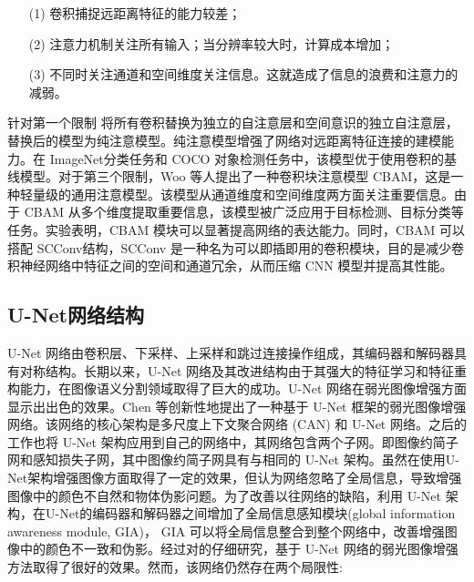 \documentclass[a4paper]{ctexart}
\begin{document}
	\begin{itemize}
		\item[(1)] 
		卷积捕捉远距离特征的能力较差；
		
		\item[(2)]
		注意力机制关注所有输入；当分辨率较大时，计算成本增加；
		
		\item[(3)]
		不同时关注通道和空间维度关注信息。这就造成了信息的浪费和注意力的减弱。
	\end{itemize}	
	
	针对第一个限制 \cite{ramachandran2019stand} 将所有卷积替换为独立的自注意层和空间意识的独立自注意层，替换后的模型为纯注意模型。纯注意模型增强了网络对远距离特征连接的建模能力。在 ImageNet分类任务和 COCO 对象检测任务中，该模型优于使用卷积的基线模型。对于第三个限制，Woo 等人\cite{woo2018cbam}提出了一种卷积块注意模型 CBAM，这是一种轻量级的通用注意模型。该模型从通道维度和空间维度两方面关注重要信息。由于 CBAM 从多个维度提取重要信息，该模型被广泛应用于目标检测、目标分类等任务。实验表明，CBAM 模块可以显著提高网络的表达能力。同时，CBAM 可以搭配 SCConv\cite{li2023scconv}结构，SCConv 是一种名为可以即插即用的卷积模块，目的是减少卷积神经网络中特征之间的空间和通道冗余，从而压缩 CNN 模型并提高其性能。
	
	\subsection{U-Net网络结构}
	
	U-Net 网络由卷积层、下采样、上采样和跳过连接操作组成，其编码器和解码器具有对称结构。长期以来，U-Net 网络及其改进结构由于其强大的特征学习和特征重构能力，在图像语义分割领域取得了巨大的成功。U-Net 网络在弱光图像增强方面显示出出色的效果。Chen 等\cite{chen2018learning}创新性地提出了一种基于 U-Net 框架的弱光图像增强网络。该网络的核心架构是多尺度上下文聚合网络 (CAN) 和 U-Net 网络。之后的工作\cite{chen2018learning, zamir2021learning}也将 U-Net 架构应用到自己的网络中，其网络包含两个子网。即图像约简子网和感知损失子网，其中图像约简子网具有与\cite{chen2018learning}相同的 U-Net 架构。虽然\cite{chen2018learning, zamir2021learning}在使用U-Net架构增强图像方面取得了一定的效果，但\cite{meng2020gia}认为\cite{chen2018learning, zamir2021learning}网络忽略了全局信息，导致增强图像中的颜色不自然和物体伪影问题。为了改善以往网络的缺陷，利用 U-Net 架构，\cite{meng2020gia}在U-Net的编码器和解码器之间增加了全局信息感知模块(global information awareness module, GIA)， GIA 可以将全局信息整合到整个网络中，改善增强图像中的颜色不一致和伪影。经过对\cite{chen2018learning, meng2020gia, zamir2021learning}的仔细研究，基于 U-Net 网络的弱光图像增强方法取得了很好的效果。然而，该网络仍然存在两个局限性:
	
\end{document}
